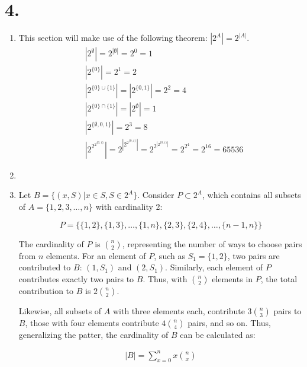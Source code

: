 \documentclass[12pt]{article}
\newcommand{\p}[1]{\item[\textnormal{(#1)}]}
\newenvironment{ps}
{\begin{enumerate}[leftmargin=0em, itemindent=1.5em]}
{\end{enumerate}}
\begin{document}
\section*{4.}

\begin{ps}
    \p{a} This section will make use of the following theorem: \( |2^A| = 2^{|A|} \).
    \begin{align*}
        & \left|2^\emptyset\right| = 2^{\left|\emptyset\right|} = 2^0 = 1 \\
        & \left|2^{\{0\}}\right| = 2^1 = 2 \\
        & \left|2^{\{0\} \cup \{1\}}\right| = \left|2^{\{0,1\}}\right| = 2^2 = 4 \\
        & \left|2^{\{0\} \cap \{1\}}\right| = \left|2^\emptyset \right| = 1 \\
        & \left|2^{\{\emptyset, 0, 1\}}\right| = 2^3 = 8 \\
        &\left|2^{2^{2^{\{0,1\}}}}\right| = 2^{\left|2^{2^{\{0, 1\}}}\right|} 
        = 2^{2^{\left| 2^{\{0, 1\}}\right|}} = 2^{2^4} = 2^{16} = 65536
    \end{align*}

    \p{b}

    \p{i} Let \( B = \{(x, S) | x \in S, S \in 2^A \}\). Consider \( P \subset 2^A \), which
    contains all subsets of \( A = \{1, 2, 3, \ldots, n\} \) with cardinality 2:

    \[
        P = \{ \{1, 2\}, \{1,3\}, \ldots, \{1, n\}, \{2, 3\}, \{2, 4\}, \ldots, \{n-1, n\} \}
    \]

    The cardinality of \( P \) is \( \binom{n}{2} \), representing the number of ways to choose
    pairs from \( n \) elements. For an element of \( P \), such as \( S_1 = \{1,2\}\), two pairs
    are contributed to \( B \): \( (1, S_1) \) and \( (2, S_1) \). Similarly, each element of \( P
    \) contributes exactly two pairs to \( B \). Thus, with \( \binom{n}{2} \) elements in \( P \),
    the total contribution to \( B \) is \( 2 \binom{n}{2} \). \par

    Likewise, all subsets of \( A \) with three elements each, contribute \( 3 \binom{n}{3} \) pairs
    to \( B \), those with four elements contribute \( 4 \binom{n}{4} \) pairs, and so on. Thus,
    generalizing the patter, the cardinality of \( B \) can be calculated as: 

    \begin{align} \label{card_B} 
        |B| = \sum_{x=0}^{n} x\binom{n}{x} 
    \end{align}


\end{ps}
\end{document}
